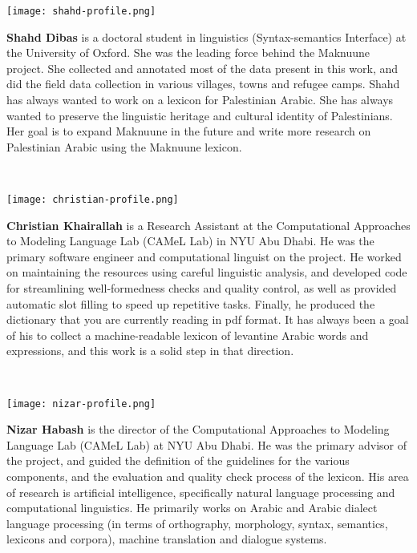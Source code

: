 \documentclass[11pt]{book}
\begin{document}
\begin{minipage}{0.2\textwidth}
\texttt{[image: shahd-profile.png]}
\end{minipage}
\begin{minipage}{0.8\textwidth}
\textbf{Shahd Dibas} is a doctoral student in linguistics (Syntax-semantics Interface) at the University of Oxford. She was the leading force behind the Maknuune project. She collected and annotated most of the data present in this work, and did the field data collection in various villages, towns and refugee camps. Shahd has always wanted to work on a lexicon for Palestinian Arabic. She has always wanted to preserve the linguistic heritage and cultural identity of Palestinians. Her goal is to expand Maknuune in the future and write more research on Palestinian Arabic using the Maknuune lexicon. 
\end{minipage} \\

\vspace{1cm}

\begin{minipage}{0.2\textwidth}
\texttt{[image: christian-profile.png]}
\end{minipage}
\begin{minipage}{0.8\textwidth}
\textbf{Christian Khairallah} is a Research Assistant at the Computational Approaches to Modeling Language Lab (CAMeL Lab) in NYU Abu Dhabi. He was the primary software engineer and computational linguist on the project. He worked on maintaining the resources using careful linguistic analysis, and developed code for streamlining well-formedness checks and quality control, as well as provided automatic slot filling to speed up repetitive tasks. Finally, he produced the dictionary that you are currently reading in pdf format. It has always been a goal of his to collect a machine-readable lexicon of levantine Arabic words and expressions, and this work is a solid step in that direction.
\end{minipage} \\

\vspace{1cm}

\begin{minipage}{0.2\textwidth}
\texttt{[image: nizar-profile.png]}
\end{minipage}
\begin{minipage}{0.8\textwidth}
\textbf{Nizar Habash} is the director of the Computational Approaches to Modeling Language Lab (CAMeL Lab) at NYU Abu Dhabi. He was the primary advisor of the project, and guided the definition of the guidelines for the various components, and the evaluation and quality check process of the lexicon. His area of research is artificial intelligence, specifically natural language processing and computational linguistics. He primarily works on Arabic and Arabic dialect language processing (in terms of orthography, morphology, syntax, semantics, lexicons and corpora), machine translation and dialogue systems.
\end{minipage} \\
\end{document}
